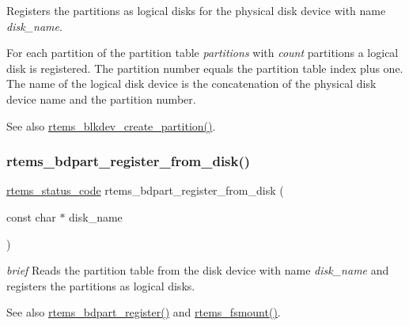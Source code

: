 Registers the partitions as logical disks for the physical disk device with name {\itshape disk\+\_\+name}. 

For each partition of the partition table {\itshape partitions} with {\itshape count} partitions a logical disk is registered. The partition number equals the partition table index plus one. The name of the logical disk device is the concatenation of the physical disk device name and the partition number.

\begin{DoxySeeAlso}{See also}
\mbox{\hyperlink{group__rtems__blkdev_ga9271a94a55c2d58494b2a43dcb55e13e}{rtems\+\_\+blkdev\+\_\+create\+\_\+partition()}}. 
\end{DoxySeeAlso}
\mbox{\label{group__rtems__bdpart_ga9b0517982a75560e134c808e70885b81}} 
\subsubsection{\texorpdfstring{rtems\_bdpart\_register\_from\_disk()}{rtems\_bdpart\_register\_from\_disk()}}
{\footnotesize\ttfamily \mbox{\hyperlink{group__ClassicStatus_ga545d41846817eaba6143d52ee4d9e9fe}{rtems\+\_\+status\+\_\+code}} rtems\+\_\+bdpart\+\_\+register\+\_\+from\+\_\+disk (\begin{DoxyParamCaption}\item[{const char $\ast$}]{disk\+\_\+name }\end{DoxyParamCaption})}

{\itshape brief} Reads the partition table from the disk device with name {\itshape disk\+\_\+name} and registers the partitions as logical disks.

\begin{DoxySeeAlso}{See also}
\mbox{\hyperlink{group__rtems__bdpart_ga36d215715c22ca86ce71f977ed760f4c}{rtems\+\_\+bdpart\+\_\+register()}} and \mbox{\hyperlink{group__rtems__fstab_gaa1e00bfe1aa6bce349c2c73092a39cc6}{rtems\+\_\+fsmount()}}. 
\end{DoxySeeAlso}
\mbox{\label{group__rtems__bdpart_ga13ba144439be58871fa6c7e26854f11a}} 
